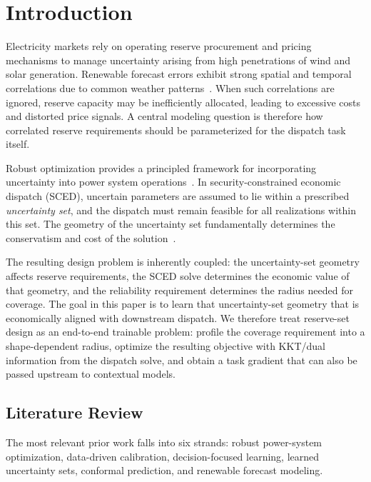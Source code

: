 \documentclass[11pt]{article}
\theoremstyle{definition}
\begin{document}
\section{Introduction}
\label{sec:introduction}

Electricity markets rely on operating reserve procurement and pricing mechanisms to manage uncertainty arising from high penetrations of wind and solar generation. Renewable forecast errors exhibit strong spatial and temporal correlations due to common weather patterns~\citep{hodge2011wind,pinson2013wind}. When such correlations are ignored, reserve capacity may be inefficiently allocated, leading to excessive costs and distorted price signals. A central modeling question is therefore how correlated reserve requirements should be parameterized for the dispatch task itself.

Robust optimization provides a principled framework for incorporating uncertainty into power system operations~\citep{ben2009robust,bertsimas2011theory}. In security-constrained economic dispatch (SCED), uncertain parameters are assumed to lie within a prescribed \emph{uncertainty set}, and the dispatch must remain feasible for all realizations within this set. The geometry of the uncertainty set fundamentally determines the conservatism and cost of the solution~\citep{bertsimas2013adaptive}.

The resulting design problem is inherently coupled: the uncertainty-set geometry affects reserve requirements, the SCED solve determines the economic value of that geometry, and the reliability requirement determines the radius needed for coverage. The goal in this paper is to learn that uncertainty-set geometry that is economically aligned with downstream dispatch. We therefore treat reserve-set design as an end-to-end trainable problem: profile the coverage requirement into a shape-dependent radius, optimize the resulting objective with KKT/dual information from the dispatch solve, and obtain a task gradient that can also be passed upstream to contextual models.

\subsection{Literature Review}

The most relevant prior work falls into six strands: robust power-system optimization, data-driven calibration, decision-focused learning, learned uncertainty sets, conformal prediction, and renewable forecast modeling.
\end{document}
